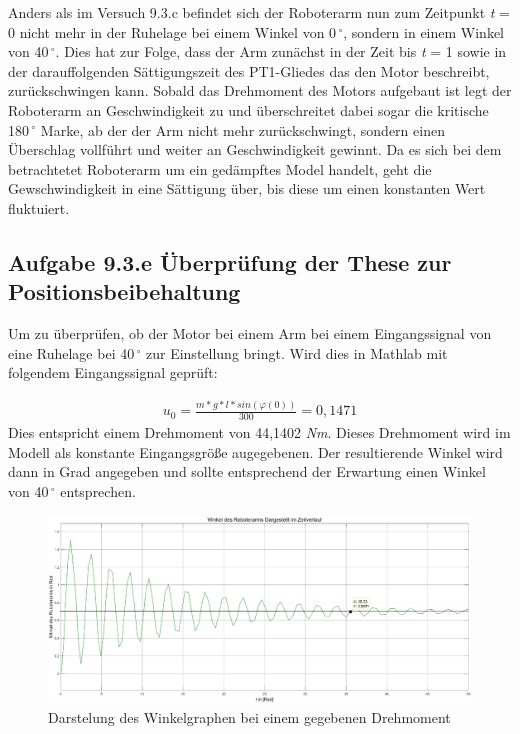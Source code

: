 \documentclass[10pt]{scrartcl}
\begin{document}
Anders als im Versuch 9.3.c befindet sich der Roboterarm nun zum Zeitpunkt \textit t = 0 nicht mehr in der Ruhelage bei einem Winkel von 0\,$^\circ$, 
sondern in einem Winkel von 40\,$^\circ$. Dies hat zur Folge, dass der Arm zunächst in der Zeit bis  \textit t = 1 sowie in der darauffolgenden Sättigungszeit des PT1-Gliedes das den Motor beschreibt, zurückschwingen kann.
Sobald das Drehmoment des Motors aufgebaut ist legt der Roboterarm an Geschwindigkeit zu und überschreitet dabei sogar die kritische 180\,$^\circ$
Marke, ab der der Arm nicht mehr zurückschwingt, sondern einen Überschlag vollführt und weiter an Geschwindigkeit gewinnt.
Da es sich bei dem betrachtetet Roboterarm um ein gedämpftes Model handelt, geht die Gewschwindigkeit in eine Sättigung über, bis diese um
einen konstanten Wert fluktuiert. 




\subsection{Aufgabe 9.3.e Überprüfung der These zur Positionsbeibehaltung}

Um zu überprüfen, ob der Motor bei einem Arm bei einem Eingangssignal von eine Ruhelage bei 40\,$^\circ$ zur Einstellung bringt. Wird dies in Mathlab mit folgendem Eingangssignal geprüft:

\begin{align}
   u_0 = \frac{m*g*l* sin( \varphi (0))}{300} = 0,1471
\end{align}
Dies entspricht einem Drehmoment von 44,1402 \textit N\textit m. Dieses Drehmoment wird im Modell als konstante Eingangsgröße augegebenen. Der resultierende Winkel wird dann in Grad angegeben und sollte entsprechend der Erwartung einen Winkel von 40\,$^\circ$ entsprechen.

\begin{figure}[H]
	\centering
	\includegraphics[width=1.2\textwidth]{Aufgabe9e}
	\caption{Darstelung des Winkelgraphen bei einem gegebenen Drehmoment}
	\label{img:grafik-dummy}
\end{figure}
\end{document}
